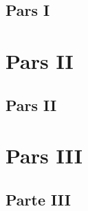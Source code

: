 \documentclass[]{report}
\begin{document}
    \chapter{Pars I}

\part{Pars II}    
    \chapter{Pars II}

\part{Pars III}
    \chapter{Parte III}



    
    
    
    

\end{document}
